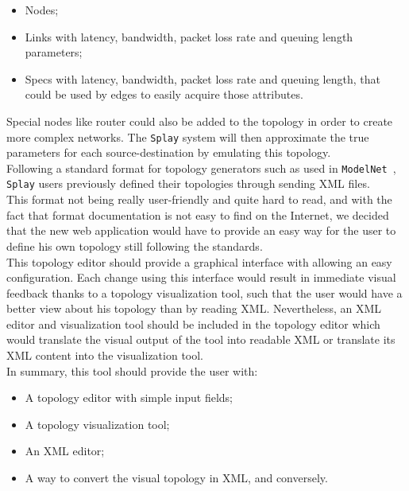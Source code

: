 \documentclass{eplmastersthesis}
\begin{document}
          \begin{itemize}
            \item Nodes;
            \item Links with latency, bandwidth, packet loss rate and queuing
            length parameters;
            \item Specs with latency, bandwidth, packet loss rate and queuing
            length, that could be used by edges to easily acquire those
            attributes.
          \end{itemize}

          Special nodes like router could also be added to the topology in order
          to create more complex networks. The \texttt{Splay} system will then
          approximate the true parameters for each source-destination by
          emulating this topology.\\

          Following a standard format for topology generators such as
          used in \texttt{ModelNet}~\cite{ModelNet}, \texttt{Splay} users previously
          defined their topologies through sending XML files.\\
          This format not being really user-friendly and quite hard to read,
          and with the fact that format documentation is not easy to find
          on the Internet, we decided that the new web application would have
          to provide an easy way for the user to define his own topology
          still following the standards.\\

          This topology editor should provide a graphical interface with
          allowing an easy configuration. Each change using this interface
          would result in immediate visual feedback thanks to a topology
          visualization tool, such that the user would have a better view about
          his topology than by reading XML. Nevertheless, an XML editor and
          visualization tool should be included in the topology editor which
          would translate the visual output of the tool into readable XML or
          translate its XML content into the visualization tool.\\

          In summary, this tool should provide the user with:

          \begin{itemize}
            \item A topology editor with simple input fields;
            \item A topology visualization tool;
            \item An XML editor;
            \item A way to convert the visual topology in XML, and conversely.
          \end{itemize}
\end{document}
